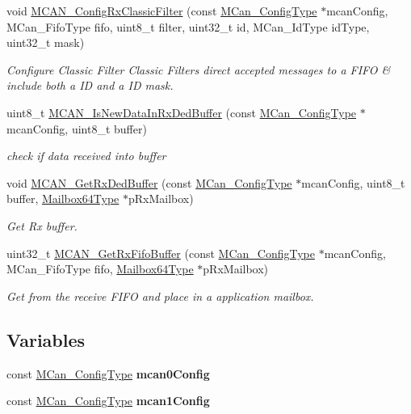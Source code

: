 \begin{DoxyCompactItemize}
void \mbox{\hyperlink{group__can__module_ga1c6df6cc059e7246465ae919dc6dd995}{M\+C\+A\+N\+\_\+\+Config\+Rx\+Classic\+Filter}} (const \mbox{\hyperlink{structMCan__ConfigTag}{M\+Can\+\_\+\+Config\+Type}} $\ast$mcan\+Config, M\+Can\+\_\+\+Fifo\+Type fifo, uint8\+\_\+t filter, uint32\+\_\+t id, M\+Can\+\_\+\+Id\+Type id\+Type, uint32\+\_\+t mask)
\begin{DoxyCompactList}\small\item\em Configure Classic Filter Classic Filters direct accepted messages to a F\+I\+FO \& include both a ID and a ID mask. \end{DoxyCompactList}\item 
uint8\+\_\+t \mbox{\hyperlink{group__can__module_ga6d84b91cbb497467aedb98b53af1db45}{M\+C\+A\+N\+\_\+\+Is\+New\+Data\+In\+Rx\+Ded\+Buffer}} (const \mbox{\hyperlink{structMCan__ConfigTag}{M\+Can\+\_\+\+Config\+Type}} $\ast$mcan\+Config, uint8\+\_\+t buffer)
\begin{DoxyCompactList}\small\item\em check if data received into buffer \end{DoxyCompactList}\item 
void \mbox{\hyperlink{group__can__module_gaa6911926348cdcfd85d9931096fafecc}{M\+C\+A\+N\+\_\+\+Get\+Rx\+Ded\+Buffer}} (const \mbox{\hyperlink{structMCan__ConfigTag}{M\+Can\+\_\+\+Config\+Type}} $\ast$mcan\+Config, uint8\+\_\+t buffer, \mbox{\hyperlink{structMailBox64Tag}{Mailbox64\+Type}} $\ast$p\+Rx\+Mailbox)
\begin{DoxyCompactList}\small\item\em Get Rx buffer. \end{DoxyCompactList}\item 
uint32\+\_\+t \mbox{\hyperlink{group__can__module_ga3c0b98bcf7b3c0520d70431cc72788cc}{M\+C\+A\+N\+\_\+\+Get\+Rx\+Fifo\+Buffer}} (const \mbox{\hyperlink{structMCan__ConfigTag}{M\+Can\+\_\+\+Config\+Type}} $\ast$mcan\+Config, M\+Can\+\_\+\+Fifo\+Type fifo, \mbox{\hyperlink{structMailBox64Tag}{Mailbox64\+Type}} $\ast$p\+Rx\+Mailbox)
\begin{DoxyCompactList}\small\item\em Get from the receive F\+I\+FO and place in a application mailbox. \end{DoxyCompactList}\end{DoxyCompactItemize}
\subsection*{Variables}
\begin{DoxyCompactItemize}
\item 
\mbox{\label{group__can__module_ga2c967cd2b5b1465a577efef751cc2b8b}} 
const \mbox{\hyperlink{structMCan__ConfigTag}{M\+Can\+\_\+\+Config\+Type}} {\bfseries mcan0\+Config}
\item 
\mbox{\label{group__can__module_ga9cb9fc1268724774f8a24f83f445dab6}} 
const \mbox{\hyperlink{structMCan__ConfigTag}{M\+Can\+\_\+\+Config\+Type}} {\bfseries mcan1\+Config}
\end{DoxyCompactItemize}



